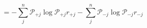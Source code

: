 \begin{equation}
\ = -\sum_j^n\mathcal P_{+j}\log\mathcal P_{+j}r_{+j} -\sum_j^n\mathcal P_{-j}\log\mathcal P_{-j} r_{-j}
\end{equation}